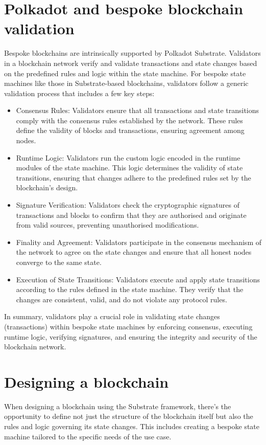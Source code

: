 \documentclass{tufte-handout}
\begin{document}
\section{Polkadot and bespoke blockchain validation}\label{sec:headings}
Bespoke blockchains are intrinsically supported by Polkadot Substrate. Validators in a blockchain network verify and validate transactions and state changes based on the
predefined rules and logic within the state machine. For bespoke state machines like those in Substrate-based blockchains, validators follow a generic validation process
that includes a few key steps:
\begin{itemize}
\item Consensus Rules: Validators ensure that all transactions and state transitions comply with the consensus rules established by the network. These rules define the validity
of blocks and transactions, ensuring agreement among nodes.
\item Runtime Logic: Validators run the custom logic encoded in the runtime modules of the state machine. This logic determines the validity of state transitions, ensuring
that changes adhere to the predefined rules set by the blockchain's design.
\item Signature Verification: Validators check the cryptographic signatures of transactions and blocks to confirm that they are authorised and originate from valid sources,
preventing unauthorised modifications.
\item Finality and Agreement: Validators participate in the consensus mechanism of the network to agree on the state changes and ensure that all honest nodes converge to the same state.
\item Execution of State Transitions: Validators execute and apply state transitions according to the rules defined in the state machine. They verify that the changes are consistent,
valid, and do not violate any protocol rules.
\end{itemize}
In summary, validators play a crucial role in validating state changes (transactions) within bespoke state machines by enforcing consensus, executing runtime logic, verifying signatures, and ensuring the integrity and security of the blockchain network.


\section{Designing a blockchain}\label{sec:headings}
When designing a blockchain using the Substrate framework, there's the opportunity to define not just the structure of the blockchain itself but also the rules and logic governing
its state changes. This includes creating a bespoke state machine tailored to the specific needs of the use case.
\end{document}
